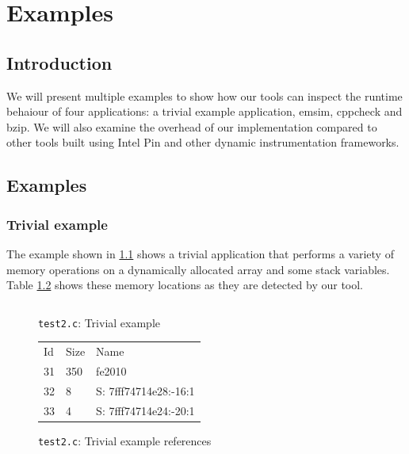 \chapter{Examples}

\section {Introduction}

We will present multiple examples to show how our tools can inspect the runtime behaiour of four applications: a trivial example application, emsim, cppcheck and bzip. We will also examine the overhead of our implementation compared to other tools built using Intel Pin and other dynamic instrumentation frameworks.

\section{Examples}

\subsection{Trivial example}

The example shown in \ref{cap4:test2} shows a trivial application that performs a variety of memory operations on a dynamically allocated array and some stack variables. Table \ref{cap4:test2references} shows these memory locations as they are detected by our tool.

\begin{figure}
	\begin{center}
		\inputminted[linenos, fontsize=\scriptsize]{c}{test2.c}
	\end{center}
	\caption{\texttt{test2.c}: Trivial example}
	\label{cap4:test2}
\end{figure}

\begin{figure}
	\begin{center}
		\begin{tabular}{l l l}
			Id & Size & Name \\
			31 & 350 & fe2010 \\
			32 & 8 & S: 7fff74714e28:-16:1 \\
			33 & 4 & S: 7fff74714e24:-20:1 \\
		\end{tabular}
	\end{center}
	\caption{\texttt{test2.c}: Trivial example references}
	\label{cap4:test2references}
\end{figure}


